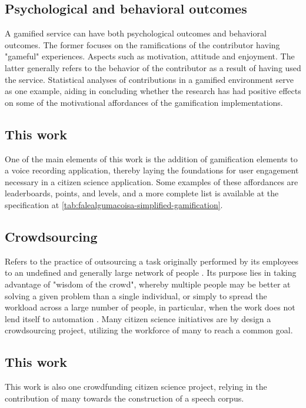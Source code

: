 \subsection{Psychological and behavioral outcomes}

A gamified service can have both psychological outcomes and behavioral outcomes. The former focuses on the ramifications of the contributor having "gameful" experiences. Aspects such as motivation, attitude and enjoyment. The latter generally refers to the behavior of the contributor as a result of having used the service. Statistical analyses of contributions in a gamified environment serve as one example, aiding in concluding whether the research has had positive effects on some of the motivational affordances of the gamification implementations.

\subsection{This work}

One of the main elements of this work is the addition of gamification elements to a voice recording application, thereby laying the foundations for user engagement necessary in a citizen science application. Some examples of these affordances are leaderboards, points, and levels, and a more complete list is available at the specification at \ref{tab:falealgumacoisa-simplified-gamification}.

\subsection{Crowdsourcing}

Refers to the practice of outsourcing a task originally performed by its employees to an undefined and generally large network of people \cite{howe2006rise}. Its purpose lies in taking advantage of "wisdom of the crowd", whereby multiple people may be better at solving a given problem than a single individual, or simply to spread the workload across a large number of people, in particular, when the work does not lend itself to automation \cite{kreitmair2019citizen}. Many citizen science initiatives are by design a crowdsourcing project, utilizing the workforce of many to reach a common goal.

\subsection{This work}

This work is also one crowdfunding citizen science project, relying in the contribution of many towards the construction of a speech corpus.

